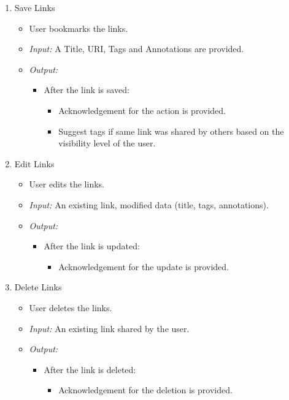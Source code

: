 \documentclass[11pt]{report} %
\begin{document}
\begin{enumerate}
	\item
		Save Links
		\begin{itemize}
			\item
				User bookmarks the links.
			\item
				\emph{Input:} A Title, URI, Tags and Annotations are provided.
			\item
				\emph{Output:} 
					\begin{itemize}
						\item				
							After the link is saved:
							\begin{itemize}
								\item
									Acknowledgement for the action is provided.
									\item
									Suggest tags if same link was shared by others based on the visibility level of the user.
							\end{itemize}			
					\end{itemize}					
		\end{itemize}

	\item
		Edit  Links
		\begin{itemize}
			\item
				User edits the links.
			\item
				\emph{Input:} An existing link, modified data (title, tags, annotations).
			\item
				\emph{Output:} 
					\begin{itemize}
						\item	
							After the link is updated:
						\begin{itemize}
							\item
								Acknowledgement for the update is provided.
						\end{itemize}						
					\end{itemize}			
		\end{itemize}


	\item
		Delete   Links
		\begin{itemize}
			\item
				User deletes  the links.
			\item
				\emph{Input:} An existing link shared by the user.
			\item
				\emph{Output:} 
					\begin{itemize}
						\item	
							After the link is deleted:
						\begin{itemize}
							\item
								Acknowledgement for the deletion is provided.
						\end{itemize}			
					\end{itemize}
			\end{itemize}


\end{enumerate}
\end{document}
